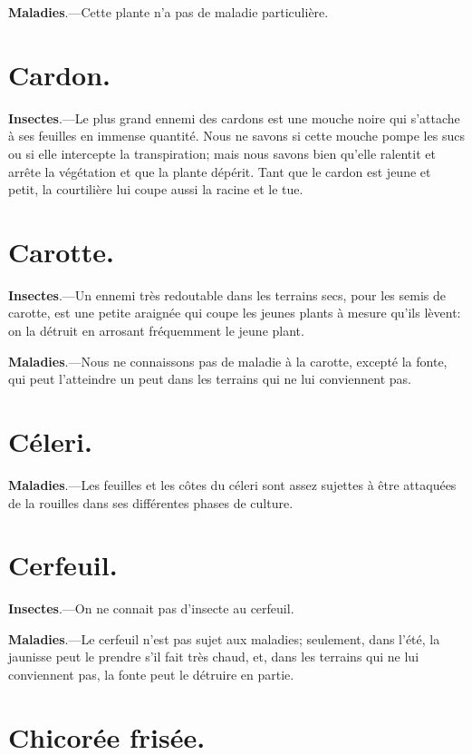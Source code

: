 \documentclass[10pt,a4paper]{book}
\begin{document}
\textbf{Maladies}.---Cette plante n'a pas de maladie particulière.

\section{Cardon.}

\textbf{Insectes}.---Le plus grand ennemi des cardons est une mouche noire qui s'attache à ses feuilles en immense quantité. Nous ne savons si cette mouche pompe les sucs ou si elle intercepte la transpiration; mais nous savons bien qu'elle ralentit et arrête la végétation et que la plante dépérit. Tant que le cardon est jeune et petit, la courtilière lui coupe aussi la racine et le tue.

\section{Carotte.}

\textbf{Insectes}.---Un ennemi très redoutable dans les terrains secs, pour les semis de carotte, est une petite araignée qui coupe les jeunes plants à mesure qu'ils lèvent: on la détruit en arrosant fréquemment le jeune plant.

\textbf{Maladies}.---Nous ne connaissons pas de maladie à la carotte, excepté la fonte, qui peut l'atteindre un peut dans les terrains qui ne lui conviennent pas.

\section{Céleri.}

\textbf{Maladies}.---Les feuilles et les côtes du céleri sont assez sujettes à être attaquées de la rouilles dans ses différentes phases de culture.

\section{Cerfeuil.}

\textbf{Insectes}.---On ne connait pas d'insecte au cerfeuil.

\textbf{Maladies}.---Le cerfeuil n'est pas sujet aux maladies; seulement, dans l'été, la jaunisse peut le prendre s'il fait très chaud, et, dans les terrains qui ne lui conviennent pas, la fonte peut le détruire en partie.

\section{Chicorée frisée.}
\end{document}
